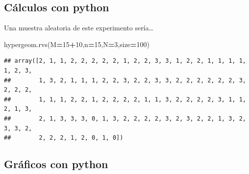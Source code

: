 \documentclass[]{book}
\newenvironment{Shaded}{\begin{snugshade}}{\end{snugshade}}
\newcommand{\DecValTok}[1]{\textcolor[rgb]{0.00,0.00,0.81}{#1}}
\newcommand{\NormalTok}[1]{#1}
\newcommand{\OperatorTok}[1]{\textcolor[rgb]{0.81,0.36,0.00}{\textbf{#1}}}
\begin{document}
\hypertarget{cuxe1lculos-con-python-13}{%
\subsection{Cálculos con python}\label{cuxe1lculos-con-python-13}}

Una muestra aleatoria de este experimento sería\ldots{}

\begin{Shaded}
\begin{Highlighting}[]
\NormalTok{hypergeom.rvs(M}\OperatorTok{=}\DecValTok{15}\OperatorTok{+}\DecValTok{10}\NormalTok{,n}\OperatorTok{=}\DecValTok{15}\NormalTok{,N}\OperatorTok{=}\DecValTok{3}\NormalTok{,size}\OperatorTok{=}\DecValTok{100}\NormalTok{)}
\end{Highlighting}
\end{Shaded}

\begin{verbatim}
## array([2, 1, 1, 2, 2, 2, 2, 2, 1, 2, 2, 3, 3, 1, 2, 2, 1, 1, 1, 1, 1, 2, 3,
##        1, 3, 2, 1, 1, 1, 2, 2, 3, 2, 2, 3, 3, 2, 2, 2, 2, 2, 2, 3, 2, 2, 2,
##        1, 1, 1, 2, 2, 1, 2, 2, 2, 2, 1, 1, 3, 2, 2, 2, 2, 3, 1, 1, 2, 1, 3,
##        2, 1, 3, 3, 3, 0, 1, 3, 2, 2, 2, 2, 3, 2, 3, 2, 2, 1, 3, 2, 3, 3, 2,
##        2, 2, 2, 1, 2, 0, 1, 0])
\end{verbatim}

\hypertarget{gruxe1ficos-con-python-4}{%
\subsection{Gráficos con python}\label{gruxe1ficos-con-python-4}}
\end{document}
